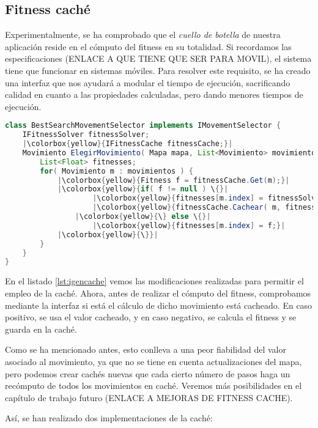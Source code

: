\subsection{Fitness caché}

Experimentalmente, se ha comprobado que el \emph{cuello de botella} de nuestra aplicación reside en el cómputo del fitness en su totalidad. Si recordamos las especificaciones (ENLACE A QUE TIENE QUE SER PARA MOVIL), el sistema tiene que funcionar en sistemas móviles. Para resolver este requisito, se ha creado una interfaz que nos ayudará a modular el tiempo de ejecución, sacrificando calidad en cuanto a las propiedades calculadas, pero dando menores tiempos de ejecución.

\begin{lstlisting}[caption={Interfaz de selección de movimiento basada en búsqueda con mejora de caché},label={lst:igencache},language=Java,escapechar=|]
class BestSearchMovementSelector implements IMovementSelector {
	IFitnessSolver fitnessSolver;
	|\colorbox{yellow}{IFitnessCache fitnessCache;}|
	Movimiento ElegirMovimiento( Mapa mapa, List<Movimiento> movimientos ) {
		List<Float> fitnesses;
		for( Movimiento m : movimientos ) {
			|\colorbox{yellow}{Fitness f = fitnessCache.Get(m);}|
			|\colorbox{yellow}{if( f != null ) \{}|
					|\colorbox{yellow}{fitnesses[m.index] = fitnessSolver.FuncionGuia( mapa, m );}|
					|\colorbox{yellow}{fitnessCache.Cachear( m, fitnesses[m.index] );}|
				|\colorbox{yellow}{\} else \{}|
					|\colorbox{yellow}{fitnesses[m.index] = f;}|
			|\colorbox{yellow}{\}}|
		}
	}
}
\end{lstlisting}


En el listado \ref{lst:igencache} vemos las modificaciones realizadas para permitir el empleo de la caché. Ahora, antes de realizar el cómputo del fitness, comprobamos mediante la interfaz si está el cálculo de dicho movimiento está cacheado. En caso positivo, se usa el valor cacheado, y en caso negativo, se calcula el fitness y se guarda en la caché.

Como se ha mencionado antes, esto conlleva a una peor fiabilidad del valor asociado al movimiento, ya que no se tiene en cuenta actualizaciones del mapa, pero podemos crear cachés nuevas que cada cierto número de pasos haga un recómputo de todos los movimientos en caché. Veremos más posibilidades en el capítulo de trabajo futuro (ENLACE A MEJORAS DE FITNESS CACHE).

Así, se han realizado dos implementaciones de la caché:

